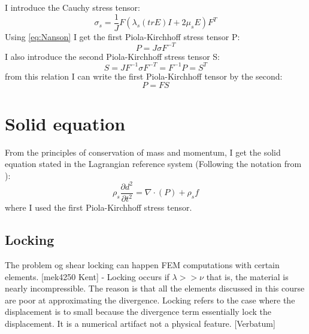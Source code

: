 I introduce the Cauchy stress tensor:
\begin{equation}
 \sigma_s = \frac{1}{J} F(\lambda_s (tr E)I + 2\mu_sE) F^T
\end{equation}
Using \eqref{eq:Nanson} I get the first Piola-Kirchhoff stress tensor P:
\begin{equation}
 P = J \sigma F^{-T} 
\end{equation}
I also introduce the second Piola-Kirchhoff stress tensor S:
\begin{equation}
S = J F^{-1}\sigma F^{-T} = F^{-1} P = S^T 
\end{equation}
from this relation I can write the first Piola-Kirchhoff tensor by the second:
\begin{equation}
P = FS
\end{equation}

\section{Solid equation}
From the principles of conservation of mass and momentum, I get the solid equation stated in the Lagrangian reference system (Following the notation from \cite{Richter2016}):
\begin{equation}\label{eq:Solid}
\rho_s \frac{\partial d^2}{\partial t^2} = \nabla \cdot ( P ) + \rho_s f 
\end{equation}
where I used the first Piola-Kirchhoff stress tensor.

\subsection*{Locking}
The problem og shear locking can happen FEM computations with certain elements. 
[mek4250 Kent] - Locking occurs if  $ \lambda >> \nu $ that is, the material is nearly incompressible. The reason is that all the elements discussed in this course are poor at approximating the divergence. Locking refers to the case where the displacement is to small because the divergence term essentially lock the displacement. It is a numerical artifact not a physical feature. [Verbatum]






